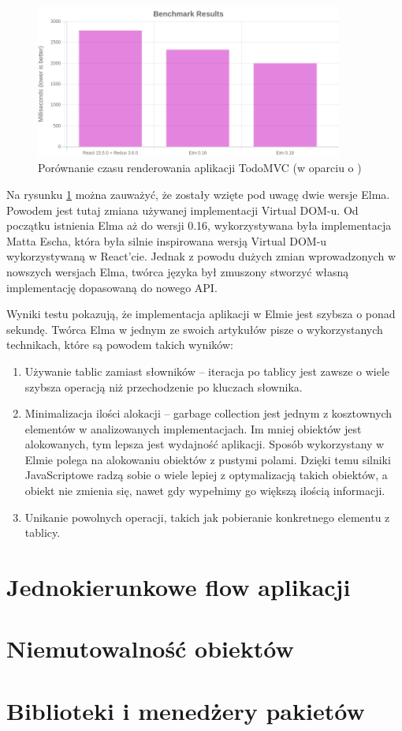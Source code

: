 \begin{figure}[h]
	\centering
	\includegraphics[width=0.9\textwidth]{images/render_comparision}
	\caption{Porównanie czasu renderowania aplikacji TodoMVC (w oparciu o \cite{perComp})}
	\label{fig:performanceComparision}
\end{figure}

Na rysunku \ref{fig:performanceComparision} można zauważyć, że zostały wzięte pod uwagę dwie wersje Elma. Powodem jest tutaj zmiana używanej implementacji Virtual DOM-u. Od początku istnienia Elma aż do wersji 0.16, wykorzystywana była implementacja Matta Escha, która była silnie inspirowana wersją Virtual DOM-u wykorzystywaną w React'cie. Jednak z powodu dużych zmian wprowadzonych w nowszych wersjach Elma, twórca języka był zmuszony stworzyć własną implementację dopasowaną do nowego API. 

Wyniki testu pokazują, że implementacja aplikacji w Elmie jest szybsza o ponad sekundę. Twórca Elma w jednym ze swoich artykułów \cite{blazingFastHtml} pisze o wykorzystanych technikach, które są powodem takich wyników:
\begin{enumerate}
	\item Używanie tablic zamiast słowników -- iteracja po tablicy jest zawsze o wiele szybsza operacją niż przechodzenie po kluczach słownika.
	\item Minimalizacja ilości alokacji -- garbage collection jest jednym z kosztownych elementów w analizowanych implementacjach. Im mniej obiektów jest alokowanych, tym lepsza jest wydajność aplikacji. Sposób wykorzystany w Elmie polega na alokowaniu obiektów z pustymi polami. Dzięki temu silniki JavaScriptowe radzą sobie o wiele lepiej z optymalizacją takich obiektów, a obiekt nie zmienia się, nawet gdy wypełnimy go większą ilością informacji.
	\item Unikanie powolnych operacji, takich jak pobieranie konkretnego elementu z tablicy. 
\end{enumerate}
\section{Jednokierunkowe flow aplikacji}

\section{Niemutowalność obiektów}

\section{Biblioteki i menedżery pakietów}
